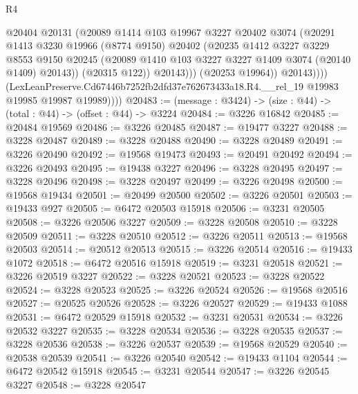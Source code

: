 \begin{lexlean}{R4}
\begin{coremodule}
                        @20404
                        @20131
                        (@20089
                          @1414
                          @103
                          @19967
                          @3227
                          @20402
                          @3074
                          (@20291
                            @1413
                            @3230
                            @19966
                            (@8774 @9150)
                            @20402
                            (@20235
                              @1412
                              @3227
                              @3229
                              @8553
                              @9150
                              @20245
                              (@20089 @1410 @103 @3227 @3227 @1409 @3074 (@20140 @1409) @20143))
                            (@20315 @122))
                          @20143)))
                    (@20253 @19964))
                  @20143))))
          (LexLeanPreserve.Cd67446b7252fb2dfd37e762673433a18.R4.__rel_19
            @19983
            @19985
            @19987
            @19989))))
@20483 := (message : @3424) -> (size : @44) -> (total : @44) -> (offset : @44) -> @3224
@20484 := @3226 @16842
@20485 := @20484 @19569
@20486 := @3226 @20485
@20487 := @19477 @3227
@20488 := @3228 @20487
@20489 := @3228 @20488
@20490 := @3228 @20489
@20491 := @3226 @20490
@20492 := @19568 @19473
@20493 := @20491 @20492
@20494 := @3226 @20493
@20495 := @19438 @3227
@20496 := @3228 @20495
@20497 := @3228 @20496
@20498 := @3228 @20497
@20499 := @3226 @20498
@20500 := @19568 @19434
@20501 := @20499 @20500
@20502 := @3226 @20501
@20503 := @19433 @927
@20505 := @6472 @20503 @15918
@20506 := @3231 @20505
@20508 := @3226 @20506 @3227
@20509 := @3228 @20508
@20510 := @3228 @20509
@20511 := @3228 @20510
@20512 := @3226 @20511
@20513 := @19568 @20503
@20514 := @20512 @20513
@20515 := @3226 @20514
@20516 := @19433 @1072
@20518 := @6472 @20516 @15918
@20519 := @3231 @20518
@20521 := @3226 @20519 @3227
@20522 := @3228 @20521
@20523 := @3228 @20522
@20524 := @3228 @20523
@20525 := @3226 @20524
@20526 := @19568 @20516
@20527 := @20525 @20526
@20528 := @3226 @20527
@20529 := @19433 @1088
@20531 := @6472 @20529 @15918
@20532 := @3231 @20531
@20534 := @3226 @20532 @3227
@20535 := @3228 @20534
@20536 := @3228 @20535
@20537 := @3228 @20536
@20538 := @3226 @20537
@20539 := @19568 @20529
@20540 := @20538 @20539
@20541 := @3226 @20540
@20542 := @19433 @1104
@20544 := @6472 @20542 @15918
@20545 := @3231 @20544
@20547 := @3226 @20545 @3227
@20548 := @3228 @20547

\end{coremodule}
\end{lexlean}
